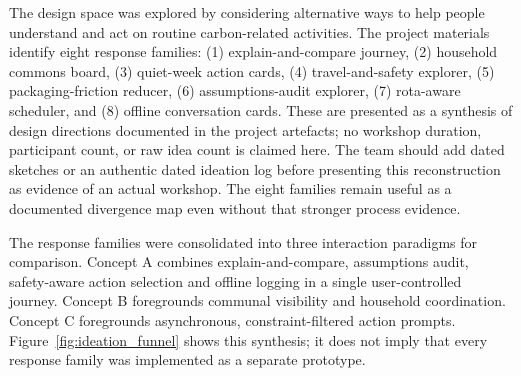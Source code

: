 \documentclass[12pt,a4paper]{article}
\begin{document}
The design space was explored by considering alternative ways to help people understand and act on routine carbon-related activities. The project materials identify eight response families: (1) explain-and-compare journey, (2) household commons board, (3) quiet-week action cards, (4) travel-and-safety explorer, (5) packaging-friction reducer, (6) assumptions-audit explorer, (7) rota-aware scheduler, and (8) offline conversation cards. These are presented as a synthesis of design directions documented in the project artefacts; no workshop duration, participant count, or raw idea count is claimed here. The team should add dated sketches or an authentic dated ideation log before presenting this reconstruction as evidence of an actual workshop. The eight families remain useful as a documented divergence map even without that stronger process evidence.

The response families were consolidated into three interaction paradigms for comparison. Concept A combines explain-and-compare, assumptions audit, safety-aware action selection and offline logging in a single user-controlled journey. Concept B foregrounds communal visibility and household coordination. Concept C foregrounds asynchronous, constraint-filtered action prompts. Figure~\ref{fig:ideation_funnel} shows this synthesis; it does not imply that every response family was implemented as a separate prototype.
\end{document}
